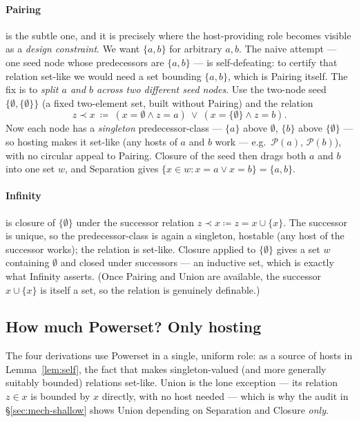 \documentclass[11pt]{article}
\theoremstyle{plain}
\theoremstyle{definition}
\newcommand{\Pow}{\mathcal{P}}
\begin{document}
\paragraph{Pairing} is the subtle one, and it is precisely where the host-providing
role becomes visible as a \emph{design constraint}. We want
$\{a,b\}$ for arbitrary $a,b$. The naive attempt --- one seed node whose
predecessors are $\{a,b\}$ --- is self-defeating: to certify that relation
set-like we would need a set bounding $\{a,b\}$, which is Pairing itself. The fix
is to \emph{split $a$ and $b$ across two different seed nodes}. Use the two-node
seed $\{\emptyset,\{\emptyset\}\}$ (a fixed two-element set, built without Pairing)
and the relation
\[
  z \prec x \ \coloneqq\ (x = \emptyset \wedge z = a)\ \vee\ (x = \{\emptyset\} \wedge z = b).
\]
Now each node has a \emph{singleton} predecessor-class --- $\{a\}$ above
$\emptyset$, $\{b\}$ above $\{\emptyset\}$ --- so hosting makes it set-like (any
hosts of $a$ and $b$ work --- e.g.\ $\Pow(a)$, $\Pow(b)$), with no circular appeal
to Pairing. Closure of the seed then drags both $a$ and $b$ into one set $w$, and
Separation gives $\{x \in w : x = a \vee x = b\} = \{a,b\}$.

\paragraph{Infinity} is closure of $\{\emptyset\}$ under the successor relation
$z \prec x \coloneqq z = x \cup \{x\}$. The successor is unique, so the
predecessor-class is again a singleton, hostable (any host of the successor works);
the relation is set-like. Closure applied to $\{\emptyset\}$ gives a set $w$ containing
$\emptyset$ and closed under successors --- an inductive set, which is exactly what
Infinity asserts. (Once Pairing and Union are available, the successor
$x \cup \{x\}$ is itself a set, so the relation is genuinely definable.)

\subsection{How much Powerset? Only hosting}\label{sec:powerset-loadbearing}

The four derivations use Powerset in a single, uniform role: as a source of hosts in
Lemma~\ref{lem:self}, the fact that makes singleton-valued (and more generally
suitably bounded) relations set-like. Union is the lone exception --- its relation
$z \in x$ is bounded by $x$ directly, with no host needed --- which is why the audit
in \S\ref{sec:mech-shallow} shows Union depending on Separation and Closure
\emph{only}.
\end{document}
